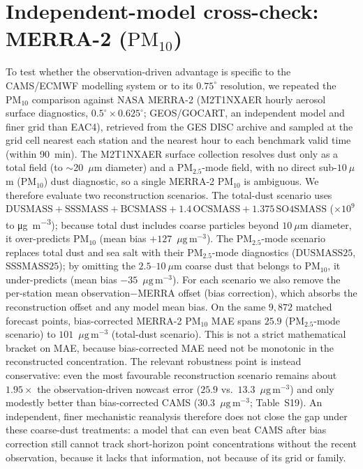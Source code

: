 \documentclass[11pt]{article}
\newcommand*{\ugm}{\ensuremath{\mu\mathrm{g\,m^{-3}}}}
\newcommand*{\pmten}{\ensuremath{\mathrm{PM_{10}}}}
\begin{document}
\section{Independent-model cross-check: MERRA-2 (\pmten{})}
To test whether the observation-driven advantage is specific to the CAMS/ECMWF modelling system or to its $0.75^\circ$ resolution, we repeated the \pmten{} comparison against NASA MERRA-2 (M2T1NXAER hourly aerosol surface diagnostics, $0.5^\circ\times0.625^\circ$; GEOS/GOCART, an independent model and finer grid than EAC4), retrieved from the GES DISC archive and sampled at the grid cell nearest each station and the nearest hour to each benchmark valid time (within 90~min). The M2T1NXAER surface collection resolves dust only as a total field (to $\sim$20~$\mu$m diameter) and a PM$_{2.5}$-mode field, with no direct sub-$10~\mu$m (PM$_{10}$) dust diagnostic, so a single MERRA-2 \pmten{} is ambiguous. We therefore evaluate two reconstruction scenarios. The total-dust scenario uses $\text{DUSMASS}+\text{SSSMASS}+\text{BCSMASS}+1.4\,\text{OCSMASS}+1.375\,\text{SO4SMASS}$ ($\times10^{9}$ to \si{\micro\gram\per\cubic\metre}); because total dust includes coarse particles beyond $10~\mu$m diameter, it over-predicts \pmten{} (mean bias $+127$~\ugm). The PM$_{2.5}$-mode scenario replaces total dust and sea salt with their PM$_{2.5}$-mode diagnostics ($\text{DUSMASS25}$, $\text{SSSMASS25}$); by omitting the $2.5$--$10~\mu$m coarse dust that belongs to \pmten{}, it under-predicts (mean bias $-35$~\ugm). For each scenario we also remove the per-station mean observation$-$MERRA offset (bias correction), which absorbs the reconstruction offset and any model mean bias. On the same $9{,}872$ matched forecast points, bias-corrected MERRA-2 \pmten{} MAE spans $25.9$ (PM$_{2.5}$-mode scenario) to $101$~\ugm{} (total-dust scenario). This is not a strict mathematical bracket on MAE, because bias-corrected MAE need not be monotonic in the reconstructed concentration. The relevant robustness point is instead conservative: even the most favourable reconstruction scenario remains about $1.95\times$ the observation-driven nowcast error ($25.9$ vs.\ $13.3$~\ugm) and only modestly better than bias-corrected CAMS ($30.3$~\ugm; Table~S19). An independent, finer mechanistic reanalysis therefore does not close the gap under these coarse-dust treatments: a model that can even beat CAMS after bias correction still cannot track short-horizon point concentrations without the recent observation, because it lacks that information, not because of its grid or family.
\end{document}

